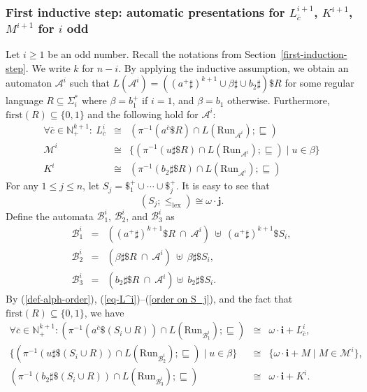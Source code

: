 \documentclass[envcountsame]{llncs}
\newcommand{\A}{\mathcal A}
\newcommand{\B}{\mathcal B}
\newcommand{\first}{\mathrm{first}}
\newcommand{\lex}{\mathrm{lex}}
\newcommand{\N}{\mathbb N}
\newcommand{\M}{\mathcal M}
\newcommand{\Run}{\mathrm{Run}}
\begin{document}
\subsubsection{First inductive step: automatic presentations for
  $L^{i+1}_{\overline{c}}$, $K^{i+1}$, $M^{i+1}$ for $i$ odd}

Let $i\geq 1$ be an odd number. 
Recall the notations from Section~\ref{first-induction-step}.
We write $k$ for $n-i$. By applying the inductive
assumption, we obtain an automaton $\A^i$ such that  $L(\A^i) =
((a^+\sharp)^{k+1} \cup \beta\sharp \cup b_2 \sharp) \$ R$ for some regular 
language $R \subseteq \Sigma_i^*$ where $\beta= b_1^+$ if $i=1$, 
and $\beta=b_1$ otherwise. Furthermore, $\first(R)
\subseteq \{0,1\}$ and the following hold for $\A^i$:
\begin{eqnarray}
\forall \overline{c}\in \N^{k+1}_+:\ L^i_{\overline{c}} & \cong &
(\pi^{-1}(a^{\overline{c}} \$ R)\cap L(\Run_{\A^i}); \sqsubseteq) \label{eq-L^i} \\
\M^i &   \cong & \{(\pi^{-1}(u \sharp \$ R) \cap L(\Run_{\A^i});
\sqsubseteq) \mid u \in \beta\} \label{eq-M^i} \\
K^i & \cong & (\pi^{-1}(b_2\sharp\$ R)\cap L(\Run_{\A^i});\sqsubseteq) \label{eq-K^i}
\end{eqnarray}
For any $1\leq j\leq n$, let $S_j = \$_1^+\cup \cdots \cup \$_j^+$.
It is easy to see that
\begin{equation} \label{order on S_j}
    (S_j ;\leq_{\lex}) \cong \omega\cdot \mathbf{j}.
\end{equation}
Define the automata $\B^{i}_1$, $\B^{i}_2$, and $\B^{i}_3$ as 
\begin{eqnarray}
    \B^i_1 &=&  ((a^+\sharp)^{k+1}\$ R \ \cap \ \A^i) \ \uplus \
    (a^+\sharp)^{k+1}\$ S_i, \label{B^i_1} \\
    \B^i_2 &=&  (\beta\sharp\$ R \ \cap \ \A^i) \ \uplus\ \beta\sharp\$ S_i,
    \label{B^i_2} \\
    \B^i_3 &=&  (b_2\sharp\$ R \ \cap \ \A^i) \uplus \ b_2\sharp \$ S_i . \label{B^i_3}
\end{eqnarray}
By (\ref{def-alph-order}), (\ref{eq-L^i})--(\ref{order on S_j}), 
and the fact that $\first(R)\subseteq \{0,1\}$, we have
\begin{eqnarray}
\forall \overline{c}\in \N^{k+1}_+: 
( \pi^{-1}(a^{\overline{c}}\$ (S_i\cup R))\cap L(\Run_{\B^i_1}); \sqsubseteq) 
           & \cong & \omega\cdot \mathbf{i} + L^i_{\overline{c}}, \label{eq-B^i_1} \\
\{(\pi^{-1}(u \sharp\$ (S_i\cup R)) \cap L(\Run_{\B^i_2}); \sqsubseteq)\mid
           u \in \beta\} 
           & \cong & \{\omega\cdot \mathbf{i}+M\mid M\in \M^i\}, \label{eq-B^i_2} \\
    (\pi^{-1}(b_2\sharp\$ (S_i\cup R)) \cap L(\Run_{\B^i_3}); \sqsubseteq) 
           & \cong & \omega\cdot \mathbf{i} + K^i . \label{eq-B^i_3}
\end{eqnarray}
\end{document}
